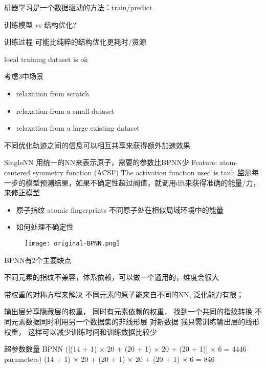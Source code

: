 \documentclass[xcolor=x11names,UTF8]{ctexbeamer}
\begin{document}
\begin{frame}
  机器学习是一个数据驱动的方法：train/predict

  训练模型 vs 结构优化?

  训练过程 可能比纯粹的结构优化更耗时/资源 

  local training dataset is ok

  考虑3中场景
  \begin{itemize}
    \item relaxation from scratch
    \item relaxation from a small dataset
    \item relaxation from a large existing dataset
  \end{itemize}

  不同优化轨迹之间的信息可以相互共享来获得额外加速效果
\end{frame}
\begin{frame}

  SingleNN  用统一的NN来表示原子，需要的参数比BPNN少
  Feature: atom-centered symmetry function (ACSF)
  The activation function used is tanh
  监测每一步的模型预测结果，如果不确定性超过阀值，就调用dft来获得准确的能量/力，来修正模型

    \begin{itemize}
    \item 原子指纹 atomic fingerprints 不同原子处在相似局域环境中的能量
    \item  如何处理不确定性
    \end{itemize}
\end{frame}

\begin{frame}


    \begin{figure}
           \texttt{[image: original-BPNN.png]}
    \end{figure}
    BPNN有2个主要缺点

    不同元素的指纹不兼容，体系依赖，可以做一个通用的，维度会很大

    带权重的对称方程来解决
    不同元素的原子能来自不同的NN, 泛化能力有限；

    输出层分享隐藏层的权重， 同时有元素依赖的权重，
%
    找到一个共同的指纹转换
    不同元素数据同时利用另一个数据集的非线形层
    对新数据 我只需训练输出层的线形权重， 这样可以减少训练时间和训练数据比较少

    超参数数量 BPNN ([(14 + 1) × 20 + (20 + 1) × 20 + (20 + 1)] × 6 = 4446 parameters)
    (14 + 1) × 20 + (20 + 1) × 20 + (20 + 1) × 6 = 846
\end{frame}
\end{document}
